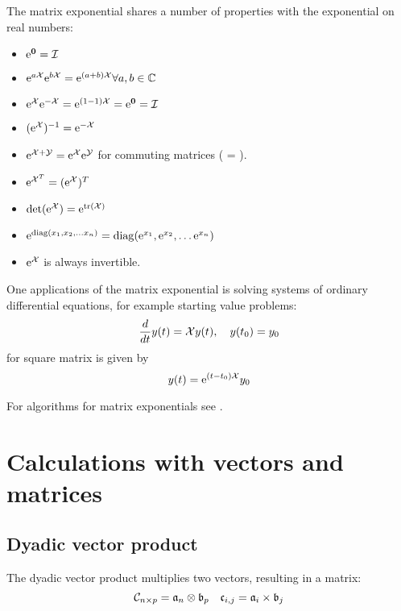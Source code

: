 \begin{refsection}
The matrix exponential shares a number of properties with the exponential on real numbers:
\begin{itemize}
  \item{\( \mathrm{e}^\mathbf{0} = \mathcal{I} \) }
  \item{\( \mathrm{e}^{a\mathcal{X}} \mathrm{e}^{b\mathcal{X}} = \mathrm{e}^{(a+b)\mathcal{X}} \forall a, b \in \mathbb{C}\) }
  \item{\( \mathrm{e}^{\mathcal{X}} \mathrm{e}^{-\mathcal{X}} = \mathrm{e}^{(1-1)\mathcal{X}} = \mathrm{e}^\mathbf{0} = \mathcal{I} \)}
  \item{\( (\mathrm{e}^{\mathcal{X}})^{-1} = \mathrm{e}^{-\mathcal{X}}\) }
  \item{\( \mathrm{e}^{\mathcal{X+Y}} = \mathrm{e}^{\mathcal{X}} \mathrm{e}^{\mathcal{Y}} \) for commuting matrices ( = ). }
  \item{\( \mathrm{e}^{\mathcal{X}^T} = (\mathrm{e}^{\mathcal{X}})^T \)}
  \item{\( \det(\mathrm{e}^{\mathcal{X}}) = \mathrm{e}^{\operatorname{tr}(\mathcal{X})} \) }
  \item{\( \mathrm{e}^{\operatorname{diag}(x_1, x_2, \ldots x_n)} = \operatorname{diag}(\mathrm{e}^{x_1}, \mathrm{e}^{x_2}, \ldots \mathrm{e}^{x_n}) \)}
  \item{\( \mathrm{e}^{\mathcal{X}} \) is always invertible. }
\end{itemize}

One applications of the matrix exponential is solving systems of ordinary differential equations, for example starting value problems:
\begin{equation}
  \frac{d}{dt} y(t) = \mathcal{X}y(t),\quad y(t_0) = y_0
\end{equation}
for square matrix  is given by
\begin{equation}
   y(t) = \mathrm{e}^{(t-t_0) \mathcal{X}} y_0
\end{equation}

For algorithms for matrix exponentials see \parencite{Mol-03,Li-11, Boc-89}.

\section{Calculations with vectors and matrices}

\subsection{Dyadic vector product}

The dyadic vector product multiplies two vectors, resulting in a matrix:
\begin{equation}
  \mathcal{C}_{n\times p} = \mathfrak{a}_n \otimes \mathfrak{b}_p\quad \mathfrak{c}_{i,j} = \mathfrak{a}_i \times \mathfrak{b}_j
\end{equation}


\end{refsection}
